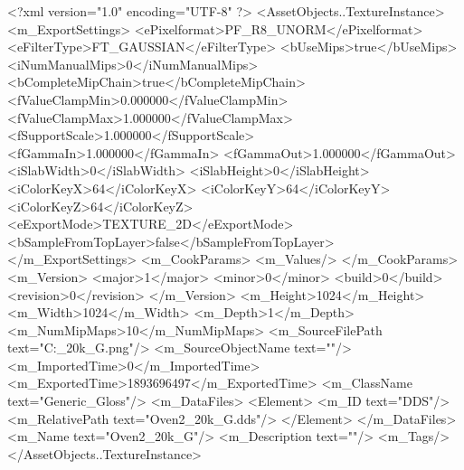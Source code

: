 <?xml version="1.0" encoding="UTF-8" ?>
<AssetObjects..TextureInstance>
	<m_ExportSettings>
		<ePixelformat>PF_R8_UNORM</ePixelformat>
		<eFilterType>FT_GAUSSIAN</eFilterType>
		<bUseMips>true</bUseMips>
		<iNumManualMips>0</iNumManualMips>
		<bCompleteMipChain>true</bCompleteMipChain>
		<fValueClampMin>0.000000</fValueClampMin>
		<fValueClampMax>1.000000</fValueClampMax>
		<fSupportScale>1.000000</fSupportScale>
		<fGammaIn>1.000000</fGammaIn>
		<fGammaOut>1.000000</fGammaOut>
		<iSlabWidth>0</iSlabWidth>
		<iSlabHeight>0</iSlabHeight>
		<iColorKeyX>64</iColorKeyX>
		<iColorKeyY>64</iColorKeyY>
		<iColorKeyZ>64</iColorKeyZ>
		<eExportMode>TEXTURE_2D</eExportMode>
		<bSampleFromTopLayer>false</bSampleFromTopLayer>
	</m_ExportSettings>
	<m_CookParams>
		<m_Values/>
	</m_CookParams>
	<m_Version>
		<major>1</major>
		<minor>0</minor>
		<build>0</build>
		<revision>0</revision>
	</m_Version>
	<m_Height>1024</m_Height>
	<m_Width>1024</m_Width>
	<m_Depth>1</m_Depth>
	<m_NumMipMaps>10</m_NumMipMaps>
	<m_SourceFilePath text="C:\Users\Shadow\Desktop\Prototypes{}_20k_G.png"/>
	<m_SourceObjectName text=""/>
	<m_ImportedTime>0</m_ImportedTime>
	<m_ExportedTime>1893696497</m_ExportedTime>
	<m_ClassName text="Generic_Gloss"/>
	<m_DataFiles>
		<Element>
			<m_ID text="DDS"/>
			<m_RelativePath text="Oven2_20k_G.dds"/>
		</Element>
	</m_DataFiles>
	<m_Name text="Oven2_20k_G"/>
	<m_Description text=""/>
	<m_Tags/>
</AssetObjects..TextureInstance>

